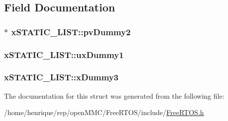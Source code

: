 \subsection{Field Documentation}
\hypertarget{structxSTATIC__LIST_a681e588716be5f49fe8e9eb73e8f280e}{
\subsubsection[{pv\-Dummy2}]{$\ast$ x\-S\-T\-A\-T\-I\-C\-\_\-\-L\-I\-S\-T\-::pv\-Dummy2}}\label{structxSTATIC__LIST_a681e588716be5f49fe8e9eb73e8f280e}
\hypertarget{structxSTATIC__LIST_a6d7f720dc21e3a676b885b72a945fea7}{
\subsubsection[{ux\-Dummy1}]{ x\-S\-T\-A\-T\-I\-C\-\_\-\-L\-I\-S\-T\-::ux\-Dummy1}}\label{structxSTATIC__LIST_a6d7f720dc21e3a676b885b72a945fea7}
\hypertarget{structxSTATIC__LIST_a232545ebb5629617e0ee6ba286e37788}{
\subsubsection[{x\-Dummy3}]{ x\-S\-T\-A\-T\-I\-C\-\_\-\-L\-I\-S\-T\-::x\-Dummy3}}\label{structxSTATIC__LIST_a232545ebb5629617e0ee6ba286e37788}


The documentation for this struct was generated from the following file\-:\begin{DoxyCompactItemize}
\item 
/home/henrique/rep/open\-M\-M\-C/\-Free\-R\-T\-O\-S/include/\hyperlink{FreeRTOS_8h}{Free\-R\-T\-O\-S.\-h}\end{DoxyCompactItemize}
